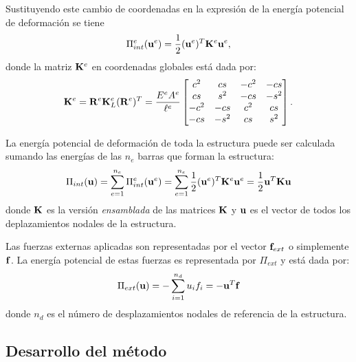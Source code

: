 
Sustituyendo este cambio de coordenadas en la expresión de la energía potencial de deformación se tiene
\begin{equation}
\Pi_{int}^e({\bf u}^e) = \frac{1}{2} ({\bf u}^e)^T {\bf K}^e {\bf u}^e,
\end{equation}
%
donde la matriz ${\bf K}^e$ en coordenadas globales está dada por:
%
\begin{equation}
{\bf K}^e = {\bf R}^e {\bf K}^e_L ({\bf R}^e)^T
= 
\frac{E^e A^e}{\ell^e}
\left[
\begin{matrix}
c^2 & cs & -c^2 & -cs \\
cs & s^2 & -cs & -s^2\\
-c^2 & -cs &  c^2 & cs\\
-cs & -s^2 & cs & s^2
\end{matrix}
\right].
\end{equation}




La energía potencial de deformación de toda la estructura puede ser calculada sumando las energías de las $n_e$ barras que forman la estructura:
%
\begin{equation}\label{eqn:matU}
  \Pi_{int}({\bf u}) = \sum_{e=1}^{n_e} \Pi_{int}^e({\bf u}^e) = 
   \sum_{e=1}^{n_e} \frac{1}{2} ({\bf u}^e)^T {\bf K}^e {\bf u}^e 
= \frac{1}{2} {\bf u}^T {\bf K} {\bf u}
\end{equation}
%
donde ${\bf K}$ es la versión \textit{ensamblada} de las matrices ${\bf K}$ y ${\bf u}$ es el vector de todos los deplazamientos nodales de la estructura.



Las fuerzas externas aplicadas son representadas por el vector ${\bf f}_{ext}$ o simplemente ${\bf f}$. %
%
La energía potencial de estas fuerzas es representada por $\Pi_{ext}$ y está dada por:
%
\begin{equation}
 \Pi_{ext}({\bf u}) = - \sum_{i=1}^{n_d} u_i f_i = - {\bf u}^T {\bf f} 
\end{equation}
%
donde $n_d$ es el número de desplazamientos nodales de referencia de la estructura.



\subsection{Desarrollo del método}

